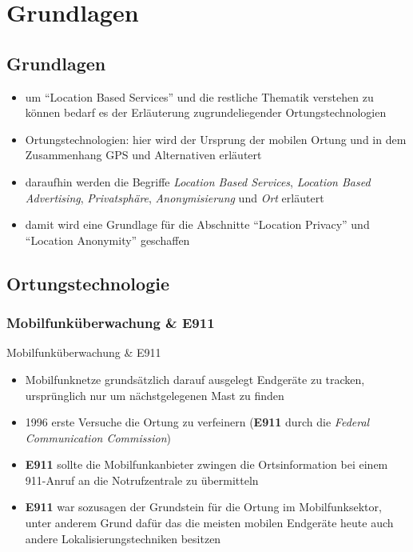 \section{Grundlagen}
\subsection{Grundlagen}
\begin{frame}
\begin{itemize}
  \item um "`Location Based Services"' und die restliche Thematik verstehen zu können bedarf es der Erläuterung zugrundeliegender Ortungstechnologien
  \item Ortungstechnologien: hier wird der Ursprung der mobilen Ortung und in dem Zusammenhang GPS und Alternativen erläutert
  \item daraufhin werden die Begriffe \textit{Location Based Services}, \textit{Location Based Advertising}, \textit{Privatsphäre}, \textit{Anonymisierung} und \textit{Ort} erläutert
  \item damit wird eine Grundlage für die Abschnitte "`Location Privacy"' und "`Location Anonymity"' geschaffen
\end{itemize}
\end{frame}

\subsection{Ortungstechnologie}
\subsubsection{Mobilfunküberwachung \& E911}
\begin{frame}{Mobilfunküberwachung \& E911}
\begin{itemize}
  \item Mobilfunknetze grundsätzlich darauf ausgelegt Endgeräte zu tracken, ursprünglich nur um nächstgelegenen Mast zu finden
  \item 1996 erste Versuche die Ortung zu verfeinern (\textbf{E911} durch die \textit{Federal Communication Commission})
  \item \textbf{E911} sollte die Mobilfunkanbieter zwingen die Ortsinformation bei einem 911-Anruf an die Notrufzentrale zu übermitteln
  \item \textbf{E911} war sozusagen der Grundstein für die Ortung im Mobilfunksektor, unter anderem Grund dafür das die meisten mobilen Endgeräte heute auch andere Lokalisierungstechniken besitzen
\end{itemize}
\end{frame}

